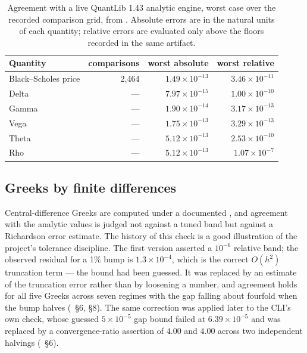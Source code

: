 \documentclass[11pt,a4paper]{article}
\begin{document}
\begin{table}[t]
\caption[Agreement with a live QuantLib 1]{Agreement with a live QuantLib 1.43 analytic engine, worst case over the recorded
comparison grid, from . Absolute
errors are in the natural units of each quantity; relative errors are evaluated only above
the floors recorded in the same artifact.}
\label{tab:bs-agreement}
\centering\small
\begin{tabular}{lrrr}
\toprule
Quantity & comparisons & worst absolute & worst relative \\
\midrule
Black--Scholes price & 2{,}464 & $1.49\times 10^{-13}$ & $3.46\times 10^{-11}$ \\
Delta & --- & $7.97\times 10^{-15}$ & $1.00\times 10^{-10}$ \\
Gamma & --- & $1.90\times 10^{-14}$ & $3.17\times 10^{-13}$ \\
Vega  & --- & $1.75\times 10^{-13}$ & $3.29\times 10^{-13}$ \\
Theta & --- & $5.12\times 10^{-13}$ & $2.53\times 10^{-10}$ \\
Rho   & --- & $5.12\times 10^{-13}$ & $1.07\times 10^{-7}$ \\
\bottomrule
\end{tabular}
\end{table}

\subsection{Greeks by finite differences}
Central-difference Greeks are computed under a documented , and agreement
with the analytic values is judged not against a tuned band but against a Richardson error
estimate. The history of this check is a good illustration of the project's tolerance
discipline. The first version asserted a $10^{-6}$ relative band; the observed residual for a
1\% bump is $1.3\times 10^{-4}$, which is the correct $O(h^2)$ truncation term --- the bound
had been guessed. It was replaced by an estimate of the truncation error rather than by
loosening a number, and agreement holds for all five Greeks across seven regimes with the gap
falling about fourfold when the bump halves
(~\S6, \S8). The same correction
was applied later to the CLI's own check, whose guessed $5\times10^{-5}$ gap bound failed at
$6.39\times 10^{-5}$ and was replaced by a convergence-ratio assertion of $4.00$ and $4.00$
across two independent halvings
(~\S6).
\end{document}
